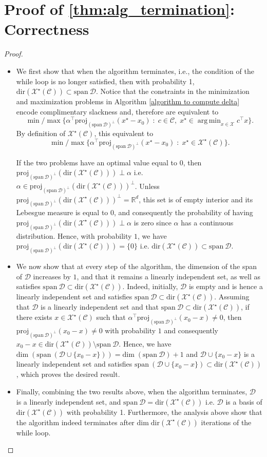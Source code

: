\documentclass[11pt]{article}
\theoremstyle{plain}
\theoremstyle{definition}
\newcommand{\R}[0]{\mathbb R}
\renewcommand{\dim}[0]{\mathrm{dim}\;}
\newcommand{\Vect}{\mathrm{span}~}
\newcommand{\proj}[2]{\mathrm{proj}_{#1}\left(#2\right)}
\newcommand{\dualpoly}[2]{#1^\star\left(#2\right)}
\newcommand{\cX}{\mathcal{X}}
\newcommand{\cC}{\mathcal{C}}
\newcommand{\cD}{\mathcal{D}}
\DeclareMathOperator*{\argmin}{arg\,min}
\newcommand{\dir}[1]{\mathrm{dir}\left(#1\right)}
\begin{document}
\section{Proof of \cref{thm:alg_termination}: Correctness}
\begin{proof}\;
\begin{itemize}
    \item We first show that when the algorithm terminates, i.e., the condition of the while loop is no longer satisfied, then with probability 1, $\dir{\dualpoly{\cX}{\cC}}\subset\Vect \cD$.
    Notice that the constraints in the minimization and maximization problems in Algorithm  \ref{algorithm to compute delta} encode complimentary slackness and, therefore are equivalent to $$\min / \max \{ \alpha^\top \proj{(\Vect \cD)^\perp}{x^\star - x_0}  \; : \; c \in \cC, \; x^\star \in \argmin_{x \in \cX} c^\top x\}.$$
    By definition of $\dualpoly{\cX}{\cC}$, this equivalent to $$\min / \max \{ \alpha^\top \proj{(\Vect \cD)^\perp}{x^\star - x_0}  \; : \; x^\star \in \dualpoly{\cX}{\cC}\}.$$
    
     If the two problems have an optimal value equal to $0$, then $\proj{(\Vect \cD)^\perp}{\dir{\dualpoly{\cX}{\cC}}}\perp \alpha$ i.e. $\alpha \in \proj{(\Vect \cD)^\perp}{\dir{\dualpoly{\cX}{\cC}}}^\perp$. Unless $\proj{(\Vect \cD)^\perp}{\dir{\dualpoly{\cX}{\cC}}}^\perp=\R^d$, this set is of empty interior and its Lebesgue measure is equal to $0$, and consequently the probability of having $\proj{(\Vect \cD)^\perp}{\dir{\dualpoly{\cX}{\cC}}}\perp \alpha$ is zero since $\alpha$ has a continuous distribution. Hence, with probability $1$, we have $\proj{(\Vect \cD)^\perp}{\dir{\dualpoly{\cX}{\cC}}}=\{0\}$ i.e. $\dir{\dualpoly{\cX}{\cC}}\subset\Vect \cD$.
    
  
    \item  We now show that at every step of the algorithm, the dimension of the span of $\cD$ increases by $1$, and that it remains a linearly independent set, as well as satisfies $\Vect \cD \subset \dir{\dualpoly{\cX}{\cC}}$. Indeed, initially, $\cD$ is empty and is hence a linearly independent set and satisfies $\Vect \cD \subset \dir{\dualpoly{\cX}{\cC}}$. Assuming that $\cD$ is a linearly independent set and that $\Vect \cD \subset \dir{\dualpoly{\cX}{\cC}}$, if there exists $x\in \dualpoly{\cX}{\cC}$ such that $\alpha^\top \proj{(\Vect \cD)^\perp}{x_0-x}\neq 0$, then $\proj{(\Vect \cD)^\perp}{x_0-x}\neq 0$ with probability $1$ and consequently $x_0-x\in \dir{\dualpoly{\cX}{\cC}}\setminus \Vect \cD$. Hence, we have $\dim (\Vect (\cD\cup\{x_0-x\}))=\dim (\Vect \cD)+1$ and $\cD\cup\{x_0-x\}$ is a linearly independent set and satisfies $\Vect (\cD\cup\{x_0-x\}) \subset \dir{\dualpoly{\cX}{\cC}}$, which proves the desired result.
    \item Finally, combining the two results above, when the algorithm terminates, $\cD$ is a linearly independent set, and $\Vect \cD=\dir{\dualpoly{\cX}{\cC}}$ i.e. $\cD$ is a basis of $\dir{\dualpoly{\cX}{\cC}}$ with probability 1. Furthermore, the analysis above show that the algorithm indeed terminates after $\dim \dir{\dualpoly{\cX}{\cC}}$ iterations of the while loop.
\end{itemize}
   

\end{proof}
\end{document}
